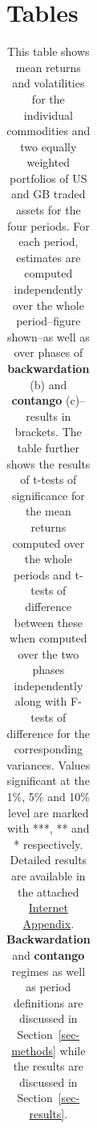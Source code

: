 \documentclass[
  authoryear,
  preprint,
  3p]{elsarticle}
\begin{document}
\newpage

\section*{Tables}\label{tables}

\newpage

\begingroup\fontsize{7}{9}\selectfont

\begin{longtable}[t]{>{}l>{}r>{}r>{}r>{}r>{}r}

\caption{\label{tbl-stats-regime-tests}This table shows mean returns and
volatilities for the individual commodities and two equally weighted
portfolios of US and GB traded assets for the four periods. For each
period, estimates are computed independently over the whole
period--figure shown--as well as over phases of \textbf{backwardation}
(b) and \textbf{contango} (c)--results in brackets. The table further
shows the results of t-tests of significance for the mean returns
computed over the whole periods and t-tests of difference between these
when computed over the two phases independently along with F-tests of
difference for the corresponding variances. Values significant at the
1\%, 5\% and 10\% level are marked with ***, ** and * respectively.
Detailed results are available in the attached
\href{https://bautheac.shinyapps.io/co-movement/}{Internet Appendix}.
\textbf{Backwardation} and \textbf{contango} regimes as well as period
definitions are discussed in Section~\ref{sec-methods} while the results
are discussed in Section~\ref{sec-results}.}

\tabularnewline


\end{longtable}
\end{document}
